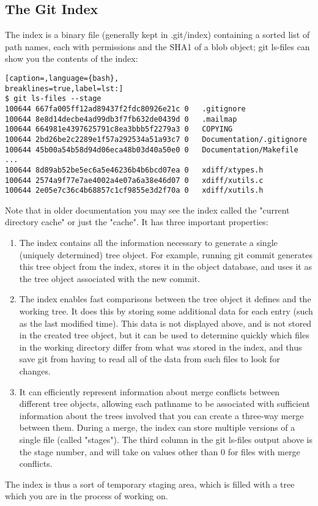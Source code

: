 \subsection{The Git Index}
The index is a binary file (generally kept in .git/index) containing a sorted
list of path names, each with permissions and the SHA1 of a blob object; git
ls-files can show you the contents of the index:
\lstset{basicstyle=\scriptsize, numbers=none, captionpos=b, tabsize=4}
\begin{lstlisting}[caption=,language={bash},
breaklines=true,label=lst:]
$ git ls-files --stage
100644 667fa005ff12ad89437f2fdc80926e21c 0   .gitignore
100644 8e8d14decbe4ad99db3f7fb632de0439d 0   .mailmap
100644 664981e4397625791c8ea3bbb5f2279a3 0   COPYING
100644 2bd26be2c2289e1f57a292534a51a93c7 0   Documentation/.gitignore
100644 45b00a54b58d94d06eca48b03d40a50e0 0   Documentation/Makefile
...
100644 8d89ab52be5ec6a5e46236b4b6bcd07ea 0   xdiff/xtypes.h
100644 2574a9f77e7ae4002a4e07a6a38e46d07 0   xdiff/xutils.c
100644 2e05e7c36c4b68857c1cf9855e3d2f70a 0   xdiff/xutils.h
\end{lstlisting}

Note that in older documentation you may see the index called the "current
directory cache" or just the "cache". It has three important properties:
\begin{enumerate}
\item The index contains all the information necessary to generate a single
(uniquely determined) tree object.  For example, running git commit generates
this tree object from the index, stores it in the object database, and uses it
as the tree object associated with the new commit.

\item The index enables fast comparisons between the tree object it defines and
the working tree.  It does this by storing some additional data for each entry
(such as the last modified time). This data is not displayed above, and is not
stored in the created tree object, but it can be used to determine quickly
which files in the working directory differ from what was stored in the index,
and thus save git from having to read all of the data from such files to look
for changes.

\item It can efficiently represent information about merge conflicts between
different tree objects, allowing each pathname to be associated with sufficient
information about the trees involved that you can create a three-way merge
between them.  During a merge, the index can store multiple versions of a
single file (called "stages"). The third column in the git ls-files output
above is the stage number, and will take on values other than 0 for files with
merge conflicts.
\end{enumerate}

The index is thus a sort of temporary staging area, which is filled with a tree
which you are in the process of working on.
